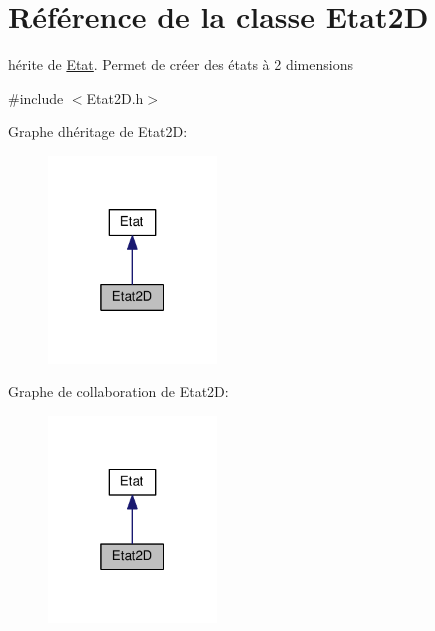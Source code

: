 \hypertarget{class_etat2_d}{}\section{Référence de la classe Etat2D}
\label{class_etat2_d}


hérite de \hyperlink{class_etat}{Etat}. Permet de créer des états à 2 dimensions  




{\ttfamily \#include $<$Etat2\+D.\+h$>$}



Graphe d\textquotesingle{}héritage de Etat2D\+:\nopagebreak
\begin{figure}[H]
\begin{center}
\leavevmode
\includegraphics[width=127pt]{class_etat2_d__inherit__graph}
\end{center}
\end{figure}


Graphe de collaboration de Etat2D\+:\nopagebreak
\begin{figure}[H]
\begin{center}
\leavevmode
\includegraphics[width=127pt]{class_etat2_d__coll__graph}
\end{center}
\end{figure}
